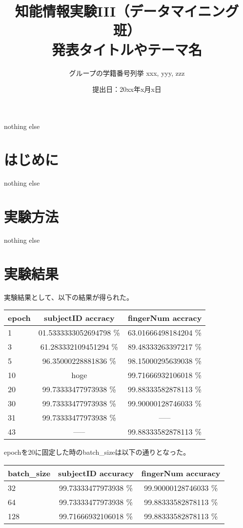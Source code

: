 \documentclass[a4paper, 11pt, titlepage]{jsarticle}
\title{知能情報実験III（データマイニング班）\\発表タイトルやテーマ名}
\author{グループの学籍番号列挙 xxx, yyy, zzz}
\date{提出日：20xx年x月x日}
\begin{document}
\maketitle
\tableofcontents
\clearpage

nothing else
\section{はじめに}
nothing else

\section{実験方法}
nothing else

\newpage
\section{実験結果}

実験結果として、以下の結果が得られた。%
\begin{table}[htb]
  \begin{tabular}{|l|c|c|}
    \hline
    epoch & subjectID accracy & fingerNum accracy \\ \hline
    1 & 01.5333333052694798 \% & 63.01666498184204 \%  \\ \hline
    3 & 61.283332109451294 \% & 89.48333263397217 \% \\ \hline
    5 & 96.35000228881836 \% & 98.15000295639038 \%  \\ \hline
    10 & hoge & 99.71666932106018 \%  \\ \hline
    20 & 99.73333477973938 \% & 99.88333582878113 \%  \\ \hline
    30 & 99.73333477973938 \% & 99.90000128746033 \% \\ \hline
    31 & 99.73333477973938  \% & ----- \\ \hline
    43 & ----- &99.88333582878113 \% \\ \hline
  \end{tabular}
\end{table}

epochを20に固定した時のbatch\_sizeは以下の通りとなった。%
\begin{table}[htb]
  \begin{tabular}{|l|c|c|}
    \hline
    batch\_size & subjectID accuracy & fingerNum accuracy  \\ \hline
    32 & 99.73333477973938 \% & 99.90000128746033 \% \\ \hline
    64 & 99.73333477973938 \% & 99.88333582878113 \% \\ \hline
    128 & 99.71666932106018 \% & 99.88333582878113 \% \\ \hline
  \end{tabular}
\end{table}
\end{document}
